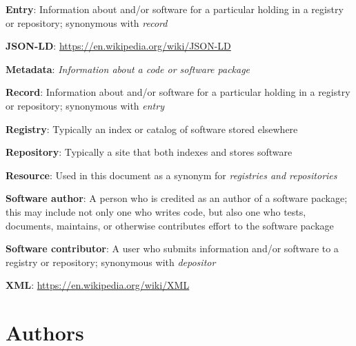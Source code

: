 \documentclass[11pt]{article}
\begin{document}
\textbf{Entry}: Information about and/or software for a particular
holding in a registry or repository; synonymous with \emph{record}

\textbf{JSON-LD}:
\url{https://en.wikipedia.org/wiki/JSON-LD}

\textbf{Metadata}: \emph{Information about a code or software package}

\textbf{Record}: Information about and/or software for a particular
holding in a registry or repository; synonymous with \emph{entry}

\textbf{Registry}: Typically an index or catalog of software stored
elsewhere

\textbf{Repository}: Typically a site that both indexes and stores
software

\textbf{Resource}: Used in this document as a synonym for
\emph{registries and repositories}

\textbf{Software author}: A person who is credited as an author of a
software package; this may include not only one who writes code, but
also one who tests, documents, maintains, or otherwise contributes
effort to the software package

\textbf{Software contributor}: A user who submits information and/or
software to a registry or repository; synonymous with \emph{depositor}

\textbf{XML}: \url{https://en.wikipedia.org/wiki/XML}


\section{Authors}
\label{authors}
\end{document}

